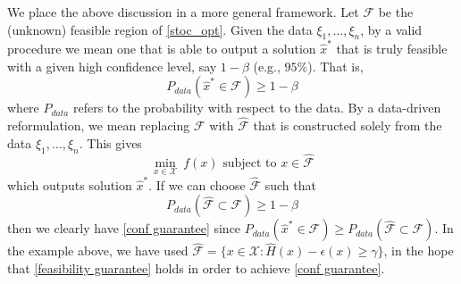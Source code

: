 \documentclass[mnsc,blindrev]{informs4} %
\begin{document}
We place the above discussion in a more general framework. Let $\mathcal F$ be the (unknown) feasible region of \eqref{stoc_opt}. Given the data $\xi_1,\ldots,\xi_n$, by a valid procedure we mean one that is able to output a solution $\hat x^*$ that is truly feasible with a given high confidence level, say $1-\beta$ (e.g., $95\%$). That is, \begin{equation}
P_{data}(\hat x^*\in\mathcal F)\geq1-\beta\label{conf guarantee}
\end{equation}
where $P_{data}$ refers to the probability with respect to the data. By a data-driven reformulation, we mean replacing $\mathcal F$ with $\hat{\mathcal F}$ that is constructed solely from the data $\xi_1,\ldots,\xi_n$. This gives
\begin{equation}
\min_{x\in\mathcal X}\ f(x)\text{\ \ subject to\ \ }x\in\hat{\mathcal F}\label{data_opt}
\end{equation}which outputs solution $\hat x^*$.
If we can choose $\hat{\mathcal F}$ such that
\begin{equation}
P_{data}(\hat{\mathcal F}\subset\mathcal F)\geq1-\beta\label{feasibility guarantee}
\end{equation}then we clearly have \eqref{conf guarantee} since $P_{data}(\hat x^*\in\mathcal F)\geq P_{data}(\hat{\mathcal  F}\subset\mathcal F)$. In the example above, we have used $\hat{\mathcal F}=\{x\in\mathcal X:\hat H(x)-\epsilon(x)\geq\gamma\}$, in the hope that \eqref{feasibility guarantee} holds in order to achieve \eqref{conf guarantee}.




\end{document}
